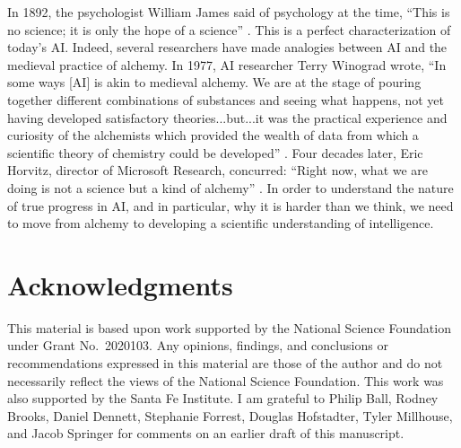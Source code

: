 \documentclass{article}
\begin{document}
In 1892, the psychologist William James said of psychology at the time, ``This is no science; it is only the hope of a science'' \cite{James1892}.  This is a perfect characterization of today's AI. Indeed, several researchers have made analogies between AI and the medieval practice of alchemy.  In 1977, AI researcher Terry Winograd wrote, ``In some ways [AI] is akin to medieval alchemy.  We are at the stage of pouring together different combinations of substances and seeing what happens, not yet having developed satisfactory theories...but...it was the practical experience and curiosity of the alchemists which provided the wealth of data from which a scientific theory of chemistry could be developed'' \cite{Winograd1977}.  Four decades later, Eric Horvitz, director of Microsoft Research, concurred: ``Right now, what we are doing is not a science but a kind of alchemy'' \cite{Metz2017}.  In order to understand the nature of true progress in AI, and in particular, why it is harder than we think, we need to move from alchemy to developing a scientific understanding of intelligence.

\pagebreak

\section*{Acknowledgments}  
This material is based upon work supported by the National Science Foundation under Grant No.\ 2020103.  Any opinions, findings, and conclusions or recommendations expressed in this material are those of the author and do not necessarily reflect the views of the National Science Foundation. This work was also supported by the Santa Fe Institute.  I am grateful to Philip Ball, Rodney Brooks, Daniel Dennett, Stephanie Forrest, Douglas Hofstadter, Tyler Millhouse, and Jacob Springer for comments on an earlier draft of this manuscript.  


\end{document}
